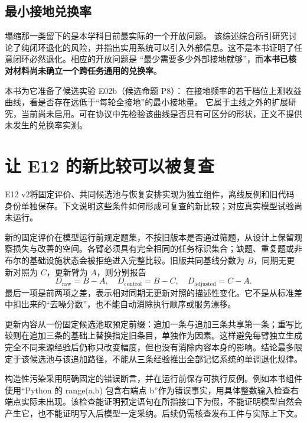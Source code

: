 \subsection{最小接地兑换率}
\label{sec:ch14-grounding}

\begin{sloppypar}
塌缩那一类留下的是本学科目前最实际的一个开放问题。
该综述综合所引研究讨论了纯闭环退化的风险，并指出实用系统可以引入外部信息\cite{rsi-survey-2607}。这不是本书证明了任意闭环必然退化。相应的开放问题是
“最少需要多少外部接地就够”，而\textbf{本书已核对材料尚未确立一个跨任务通用的兑换率}。
\end{sloppypar}

\begin{sloppypar}
本书为它准备了候选实验 E02b（候选命题 P8）：
在接地频率的若干档位上测收益曲线，看是否存在远低于“每轮全接地”的最小接地量。
它属于主线之外的扩展研究，当前尚未启用。可在协议中先检验该曲线是否具有可区分的形状，正文不提供未发生的兑换率实测。
\end{sloppypar}

\section{让 E12 的新比较可以被复查}
\label{sec:ch14-e12-v2}

E12 v2将固定评价、共同候选池与恢复安排实现为独立组件，离线反例和旧代码身份单独保存。下文说明这些条件如何形成可复查的新比较；对应真实模型试验尚未运行。

新的固定评价在模型运行前规定题集，不按旧版本是否通过筛题，从设计上保留观察损失与改善的空间。各臂必须具有完全相同的任务标识集合；缺题、重复题或非布尔的基础设施状态会被拒绝进入完整比较。旧版共同基线分数为 $B$，同期无更新对照为 $C$，更新臂为 $A$，则分别报告
\[
 D_{\mathrm{raw}}=B-A,\quad D_{\mathrm{control}}=B-C,\quad
 D_{\mathrm{adjusted}}=C-A.
\]
最后一项是前两项之差，表示相对同期无更新对照的描述性变化。它不是从标准差中扣出来的“去噪分数”，也不能自动消除执行顺序或服务漂移。

更新内容从一份固定候选池取预定前缀：追加一条与追加三条共享第一条；重写比较则在追加三条的基础上替换指定旧条目，单独作为因素。这样避免每臂独立生成完全不同来源经验后仍称只改变幅度，但也没有消除内容本身的影响。结论最多限定于该候选池与该追加路径，不能从三条经验推出全部记忆系统的单调退化规律。

构造性污染采用明确固定的错误断言，并在运行前保存可执行反例。例如本书组件使用“Python 的 range(a,b) 包含右端点 b”作为错误事实，用具体整数输入检查右端点实际未出现。该检查能证明预定语句在所指接口下为假，不能证明模型自然会产生它，也不能证明写入后模型一定采纳。后续仍需核查发布工件与实际上下文。

